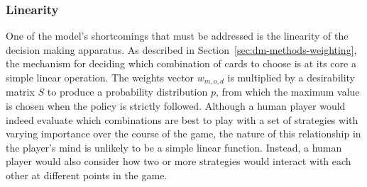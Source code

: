 
\subsubsection*{Linearity}
\label{sec:disc-shortcomings-linearity}


One of the model's shortcomings that must be addressed is the linearity
of the decision making apparatus.
%
As described in Section~\ref{sec:dm-methods-weighting},
the mechanism for deciding which combination of cards to choose is\textemdash
at its core\textemdash
a simple linear operation.
%
The weights vector $w_{m,o,d}$ is multiplied by a desirability matrix $S$
to produce a probability distribution $p$,
from which the maximum value is chosen when the policy is strictly followed.
%
Although a human player would indeed evaluate which combinations are best
to play with a set of strategies with varying importance over the course
of the game,
the nature of this relationship in the player's mind is unlikely
to be a simple linear function.
%
Instead,
a human player would also consider how two or more strategies would interact
with each other at different points in the game.

